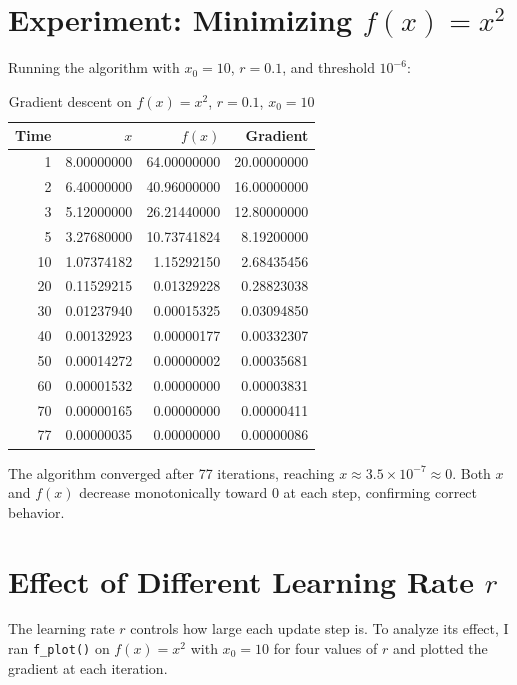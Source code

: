 \documentclass[12pt,a4paper]{article}
\begin{document}
\section{Experiment: Minimizing $f(x) = x^2$}

Running the algorithm with $x_0 = 10$, $r = 0.1$, and threshold $10^{-6}$:

\begin{table}[H]
\centering
\caption{Gradient descent on $f(x)=x^2$, $r=0.1$, $x_0=10$}
\begin{tabular}{rrrr}
\toprule
\textbf{Time} & $x$ & $f(x)$ & Gradient \\
\midrule
1  & 8.00000000 & 64.00000000 & 20.00000000 \\
2  & 6.40000000 & 40.96000000 & 16.00000000 \\
3  & 5.12000000 & 26.21440000 & 12.80000000 \\
5  & 3.27680000 & 10.73741824 &  8.19200000 \\
10 & 1.07374182 &  1.15292150 &  2.68435456 \\
20 & 0.11529215 &  0.01329228 &  0.28823038 \\
30 & 0.01237940 &  0.00015325 &  0.03094850 \\
40 & 0.00132923 &  0.00000177 &  0.00332307 \\
50 & 0.00014272 &  0.00000002 &  0.00035681 \\
60 & 0.00001532 &  0.00000000 &  0.00003831 \\
70 & 0.00000165 &  0.00000000 &  0.00000411 \\
77 & 0.00000035 &  0.00000000 &  0.00000086 \\
\bottomrule
\end{tabular}
\end{table}

The algorithm converged after 77 iterations, reaching $x \approx 3.5 \times 10^{-7} \approx 0$.
Both $x$ and $f(x)$ decrease monotonically toward $0$ at each step, confirming correct behavior.

\section{Effect of Different Learning Rate $r$}

The learning rate $r$ controls how large each update step is. To analyze its effect,
I ran \texttt{f\_plot()} on $f(x) = x^2$ with $x_0 = 10$ for four values of $r$
and plotted the gradient at each iteration.
\end{document}
